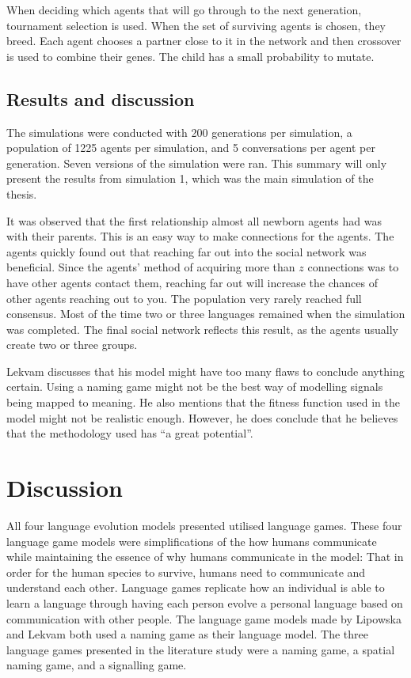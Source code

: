 When deciding which agents that will go through to the next generation, tournament selection is used. When the set of surviving agents is chosen, they breed. Each agent chooses a partner close to it in the network and then crossover is used to combine their genes. The child has a small probability to mutate. 

\subsection{Results and discussion}
The simulations were conducted with 200 generations per simulation, a population of 1225 agents per simulation, and 5 conversations per agent per generation. Seven versions of the simulation were ran. This summary will only present the results from simulation 1, which was the main simulation of the thesis. 

It was observed that the first relationship almost all newborn agents had was with their parents. This is an easy way to make connections for the agents. The agents quickly found out that reaching far out into the social network was beneficial. Since the agents' method of acquiring more than $z$ connections was to have other agents contact them, reaching far out will increase the chances of other agents reaching out to you. The population very rarely reached full consensus. Most of the time two or three languages remained when the simulation was completed. The final social network reflects this result, as the agents usually create two or three groups.

Lekvam discusses that his model might have too many flaws to conclude anything certain. Using a naming game might not be the best way of modelling signals being mapped to meaning. He also mentions that the fitness function used in the model might not be realistic enough. However, he does conclude that he believes that the methodology used has ``a great potential''.


\section{Discussion}
All four language evolution models presented utilised language games. These four language game models were simplifications of the how humans communicate while maintaining the essence of why humans communicate in the model: That in order for the human species to survive, humans need to communicate and understand each other. Language games replicate how an individual is able to learn a language through having each person evolve a personal language based on communication with other people. The language game models made by Lipowska and Lekvam \citet{lipowska2011naming, lekvam2014co} both used a naming game as their language model. The three language games presented in the literature study were a naming game, a spatial naming game, and a signalling game. 

